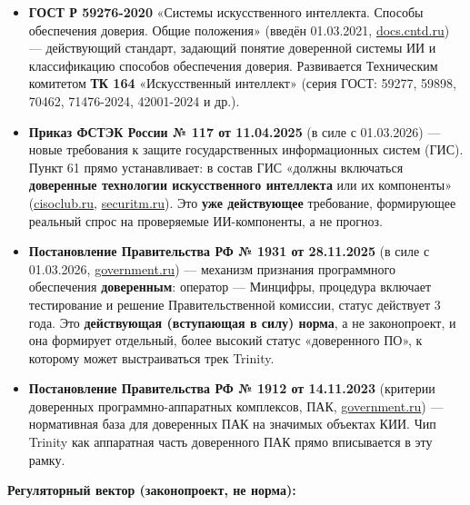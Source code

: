\documentclass[
  russian,
]{article}
\providecommand{\tightlist}{%
  \setlength{\itemsep}{0pt}\setlength{\parskip}{0pt}}
\begin{document}
\begin{itemize}
\tightlist
\item
  \textbf{ГОСТ Р 59276-2020} «Системы искусственного интеллекта. Способы
  обеспечения доверия. Общие положения» (введён 01.03.2021,
  \href{https://docs.cntd.ru/document/1200177291}{docs.cntd.ru}) ---
  действующий стандарт, задающий понятие доверенной системы ИИ и
  классификацию способов обеспечения доверия. Развивается Техническим
  комитетом \textbf{ТК 164} «Искусственный интеллект» (серия ГОСТ:
  59277, 59898, 70462, 71476-2024, 42001-2024 и др.).
\item
  \textbf{Приказ ФСТЭК России № 117 от 11.04.2025} (в силе с 01.03.2026)
  --- новые требования к защите государственных информационных систем
  (ГИС). Пункт 61 прямо устанавливает: в состав ГИС «должны включаться
  \textbf{доверенные технологии искусственного интеллекта} или их
  компоненты»
  (\href{https://cisoclub.ru/prikaz-fstek-117/}{cisoclub.ru},
  \href{https://service.securitm.ru/docs/fstek-117/p-61}{securitm.ru}).
  Это \textbf{уже действующее} требование, формирующее реальный спрос на
  проверяемые ИИ-компоненты, а не прогноз.
\item
  \textbf{Постановление Правительства РФ № 1931 от 28.11.2025} (в силе с
  01.03.2026,
  \href{http://government.ru/docs/all/162383/}{government.ru}) ---
  механизм признания программного обеспечения \textbf{доверенным}:
  оператор --- Минцифры, процедура включает тестирование и решение
  Правительственной комиссии, статус действует 3 года. Это
  \textbf{действующая (вступающая в силу) норма}, а не законопроект, и
  она формирует отдельный, более высокий статус «доверенного ПО», к
  которому может выстраиваться трек Trinity.
\item
  \textbf{Постановление Правительства РФ № 1912 от 14.11.2023} (критерии
  доверенных программно-аппаратных комплексов, ПАК,
  \href{http://government.ru/docs/all/150563/}{government.ru}) ---
  нормативная база для доверенных ПАК на значимых объектах КИИ. Чип
  Trinity как аппаратная часть доверенного ПАК прямо вписывается в эту
  рамку.
\end{itemize}

\textbf{Регуляторный вектор (законопроект, не норма):}
\end{document}

